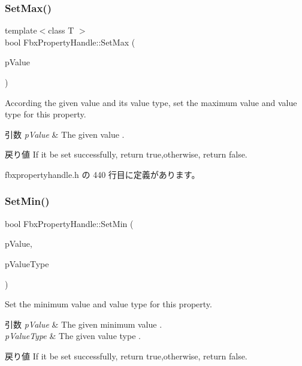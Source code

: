 \subsubsection{\texorpdfstring{Set\+Max()}{SetMax()}\hspace{0.1cm}{\footnotesize\ttfamily [2/2]}}
{\footnotesize\ttfamily template$<$class T $>$ \\
bool Fbx\+Property\+Handle\+::\+Set\+Max (\begin{DoxyParamCaption}\item[{const T \&}]{p\+Value }\end{DoxyParamCaption})\hspace{0.3cm}{\ttfamily [inline]}}

According the given value and its value type, set the maximum value and value type for this property. 
\begin{DoxyParams}{引数}
{\em p\+Value} & The given value . \\
\hline
\end{DoxyParams}
\begin{DoxyReturn}{戻り値}
If it be set successfully, return true,otherwise, return false. 
\end{DoxyReturn}


 fbxpropertyhandle.\+h の 440 行目に定義があります。

\mbox{\label{class_fbx_property_handle_a699f3d09a345e575b75ebe97c089b82c}} 
\subsubsection{\texorpdfstring{Set\+Min()}{SetMin()}\hspace{0.1cm}{\footnotesize\ttfamily [1/2]}}
{\footnotesize\ttfamily bool Fbx\+Property\+Handle\+::\+Set\+Min (\begin{DoxyParamCaption}\item[{const void $\ast$}]{p\+Value,  }\item[{\hyperlink{fbxpropertytypes_8h_a73913a5ddfb20e57c6f25e9e6784bd92}{E\+Fbx\+Type}}]{p\+Value\+Type }\end{DoxyParamCaption})}

Set the minimum value and value type for this property. 
\begin{DoxyParams}{引数}
{\em p\+Value} & The given minimum value . \\
\hline
{\em p\+Value\+Type} & The given value type . \\
\hline
\end{DoxyParams}
\begin{DoxyReturn}{戻り値}
If it be set successfully, return true,otherwise, return false. 
\end{DoxyReturn}
\mbox{\label{class_fbx_property_handle_ab37a7e2831a4ca20879d4b8b57877361}} 
